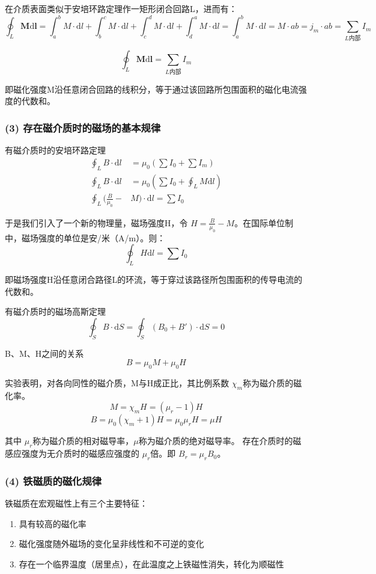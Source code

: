 在介质表面类似于安培环路定理作一矩形闭合回路L，进而有：
$$
\oint_L \boldsymbol{M}\mathrm{d}\boldsymbol{l}
=\int_{a}^{b}M\cdot \mathrm{d}l+\int_{b}^{c}M\cdot \mathrm{d}l+\int_{c}^{d}M\cdot \mathrm{d}l+\int_{d}^{a}M\cdot \mathrm{d}l
=\int_{a}^{b}M\cdot \mathrm{d}l
=M\cdot ab
=j_m \cdot ab
=\sum_{L\text{内部}}I_m
$$

$$
\oint_L \boldsymbol{M}\mathrm{d}\boldsymbol{l}=\sum_{L\text{内部}}I_m
$$

{\kaishu 即磁化强度M沿任意闭合回路的线积分，等于通过该回路所包围面积的磁化电流强度的代数和。}

\subsubsection{(3) 存在磁介质时的磁场的基本规律}

{\heiti 有磁介质时的安培环路定理}
$$
\begin{aligned}
  \oint_L B\cdot \mathrm{d}l&=\mu_0(\sum I_0+\sum I_m)\\
  \oint_L B\cdot \mathrm{d}l&=\mu_0(\sum I_0+\oint_L M\mathrm{d}l)\\
  \oint_L (\frac{B}{\mu_0}-&M)\cdot \mathrm{d}l=\sum I_0
\end{aligned}
$$

于是我们引入了一个新的物理量，{\heiti 磁场强度}H，令 $\displaystyle H=\frac{B}{\mu_0}-M$。在国际单位制中，磁场强度的单位是安/米（A/m）。则：
$$
\oint_L H\mathrm{d}l=\sum I_0
$$

{\kaishu 即磁场强度H沿任意闭合路径L的环流，等于穿过该路径所包围面积的传导电流的代数和。}

{\heiti 有磁介质时的磁场高斯定理}
$$
\oint_S B\cdot \mathrm{d}S=\oint_S (B_0+B')\cdot \mathrm{d}S=0
$$

{\heiti B、M、H之间的关系}
$$
B=\mu_0 M +\mu_0 H 
$$

实验表明，对各向同性的磁介质，M与H成正比，其比例系数 $\chi_m$称为磁介质的磁化率。
$$
M=\chi_m H=(\mu_r-1)H
$$
$$
B=\mu_0(\chi_m+1)H=\mu_0\mu_rH=\mu H
$$

其中 $\mu_r$称为磁介质的相对磁导率，$\mu$称为磁介质的绝对磁导率。
存在介质时的磁感应强度为无介质时的磁感应强度的 $\mu_r$倍。即
$B_r=\mu_rB_0$。

\subsubsection{(4) 铁磁质的磁化规律}

铁磁质在宏观磁性上有三个主要特征：
\begin{enumerate}
  \item 具有较高的磁化率
  \item 磁化强度随外磁场的变化呈非线性和不可逆的变化
  \item 存在一个临界温度（居里点），在此温度之上铁磁性消失，转化为顺磁性
\end{enumerate}

